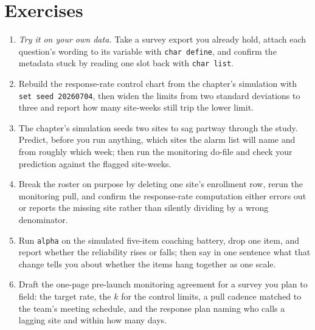 \section*{Exercises}
\begin{enumerate}
\item \emph{Try it on your own data.} Take a survey export you already hold, attach each question's wording to its variable with \texttt{char define}, and confirm the metadata stuck by reading one slot back with \texttt{char list}.
\item Rebuild the response-rate control chart from the chapter's simulation with \texttt{set seed 20260704}, then widen the limits from two standard deviations to three and report how many site-weeks still trip the lower limit.
\item The chapter's simulation seeds two sites to sag partway through the study. Predict, before you run anything, which sites the alarm list will name and from roughly which week; then run the monitoring do-file and check your prediction against the flagged site-weeks.
\item Break the roster on purpose by deleting one site's enrollment row, rerun the monitoring pull, and confirm the response-rate computation either errors out or reports the missing site rather than silently dividing by a wrong denominator.
\item Run \texttt{alpha} on the simulated five-item coaching battery, drop one item, and report whether the reliability rises or falls; then say in one sentence what that change tells you about whether the items hang together as one scale.
\item Draft the one-page pre-launch monitoring agreement for a survey you plan to field: the target rate, the $k$ for the control limits, a pull cadence matched to the team's meeting schedule, and the response plan naming who calls a lagging site and within how many days.
\end{enumerate}
